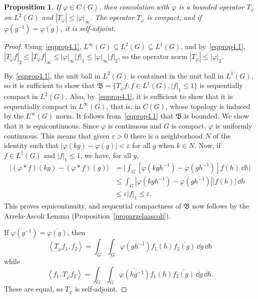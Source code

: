 \documentclass[12pt,reqno]{book}%
\newtheorem{proposition}{Proposition}[chapter]
\theoremstyle{definition}
\theoremstyle{remark}
\theoremstyle{theorem}
\theoremstyle{remark}
\renewcommand{\d}{\dd}
\begin{document}
\begin{proposition}\label{prop4.2}%
    If $\varphi \in C(G)$, then convolution with $\varphi$ is a bounded operator $T_\varphi$ on $L^2(G)$ and $|T_\varphi| \leq |\varphi|_\infty$.
    The operator $T_\varphi$ is compact, and if $\varphi(g^{-1}) = \overline{\varphi(g)}$, it is self-adjoint.
\end{proposition}%
\begin{proof}%
    Using~\eqref{eqprop4.1}, $L^\infty(G) \subseteq L^2(G) \subseteq L^1(G)$, and by~\eqref{eqprop4.1}, $|T_\varphi f|_2 \leq |T_\varphi f|_\infty \leq |\varphi|_\infty |f|_1 \leq |\varphi|_\infty |f|_2$, so the operator norm $|T_\varphi| \leq |\varphi|_2$.

    By~\eqref{eqprop4.1}, the unit ball in $L^2(G)$ is contained in the unit ball in $L^1(G)$, so it is sufficient to show that $\mathfrak{B} = \{T_\varphi f : f \in L^1(G), |f|_1 \leq 1\}$ is sequentially compact in $L^2(G)$.
    Also, by~\eqref{eqprop4.1}, it is sufficient to show that it is sequentially compact in $L^\infty(G)$, that is, in $C(G)$, whose topology is induced by the $L^\infty(G)$ norm.
    It follows from~\eqref{eqprop4.1} that $\mathfrak{B}$ is bounded.
    We show that it is equicontinuous.
    Since $\varphi$ is continuous and $G$ is compact, $\varphi$ is uniformly continuous.
    This means that given $\varepsilon > 0$ there is a neighborhood $N$ of the identity such that $|\varphi(kg) - \varphi(g)| < \varepsilon$ for all $g$ when $k \in N$.
    Now, if $f \in L^1(G)$ and $|f|_1 \leq 1$, we have, for all $g$,
    \begin{align*}
        |(\varphi * f)(kg) - (\varphi * f)(g)| &= \bigg|\int_{G} [\varphi(kgh^{-1}) - \varphi(gh^{-1})] f(h) \, \d h \bigg| \\
        &\leq \int_{G} |\varphi(kgh^{-1}) - \varphi(gh^{-1})| |f(h)| \, \d h \\
        &\leq \varepsilon|f|_1 \leq \varepsilon.
    \end{align*}
    This proves equicontinuity, and sequential compactness of $\mathfrak{B}$ now follows by the Arzela-Ascoli Lemma (Proposition~\ref{proparzelaascoli}).

    If $\varphi(g^{-1}) = \overline{\varphi(g)}$, then
    \[
        {\left\langle T_\varphi f_1, f_2\right\rangle} = \int_{G} \int_{G} \varphi(gh^{-1}) f_1(h) \overline{f_2(g)} \, \d g \, \d h
    \]
    while
    \[
        {\left\langle f_1, T_\varphi f_2\right\rangle} = \int_{G} \int_{G} \overline{\varphi(hg^{-1})}f_1(h) \overline{f_2(g)} \, \d g \, \d h.
    \]
    These are equal, so $T_\varphi$ is self-adjoint.
\end{proof}%
\end{document}
